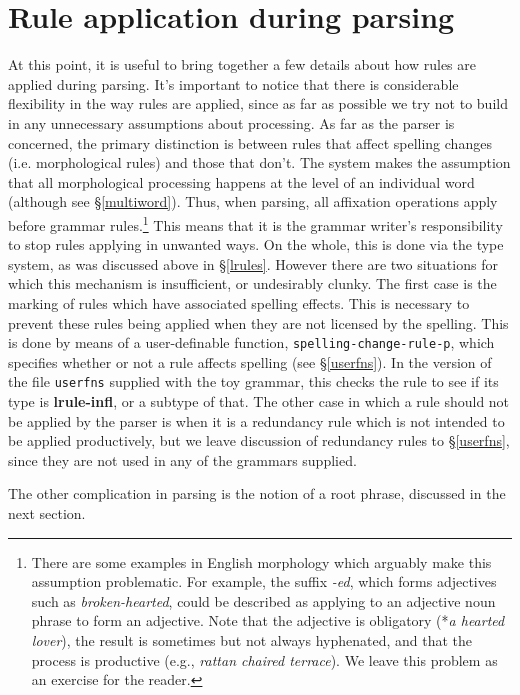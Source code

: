 \documentclass[12pt]{report}
\begin{document}
\section{Rule application during parsing}
\label{parse}

At this point, it is useful to bring together a few details
about how rules are applied during parsing.
It's important to notice that there is
considerable flexibility in the way rules are applied, 
since as far as possible
we try not to build in any unnecessary assumptions about processing.  
As far as
the parser is concerned, the primary distinction is between rules that affect
spelling changes (i.e. morphological rules) and those that don't.  The system
makes the assumption that all morphological processing happens at the level of
an individual word (although see \S\ref{multiword}).  Thus, when parsing, all
affixation operations apply before grammar rules.\footnote{There are some
examples in English morphology which arguably make this assumption problematic.
For example, the suffix {\it -ed}, which forms adjectives such as {\it
broken-hearted}, could be described as applying to an adjective noun phrase to
form an adjective.  Note that the adjective is obligatory (*{\it a hearted
lover}), the result is sometimes but not always hyphenated, and that the
process is productive (e.g., {\it rattan chaired terrace}).  We leave this
problem as an exercise for the reader.}
This means that it is the grammar writer's responsibility to
stop rules applying in unwanted ways.  On the whole, this is done
via the type system, as was discussed above in \S\ref{lrules}.
However there are two situations for which this mechanism 
is insufficient, or undesirably clunky.
The first case is the marking of rules which have associated spelling 
effects.  This is necessary to prevent these rules being applied
when they are not licensed by the spelling.  This is done by means
of a user-definable function, {\tt spelling-change-rule-p},
which specifies whether or not a rule
affects spelling (see \S\ref{userfns}).  In the 
version of the file {\tt userfns} supplied with the toy grammar,
this checks the rule to see if its type is {\bf lrule-infl}, or
a subtype of that.
The other case in which a rule should not be applied by the 
parser is when it is a redundancy rule which
is not intended to be applied productively, but we leave discussion of
redundancy rules 
to \S\ref{userfns}, since they are not used in any of the grammars
supplied.

The other complication in parsing is the notion of a root phrase,
discussed in the next section.
\end{document}
